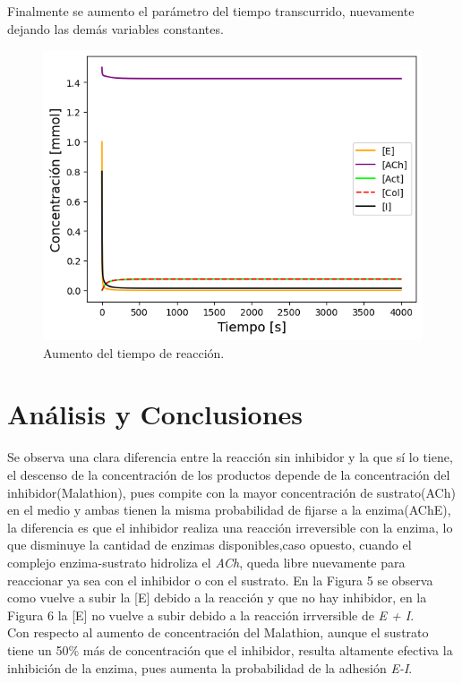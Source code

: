 Finalmente se aumento el parámetro del tiempo transcurrido, nuevamente dejando las demás variables constantes.

\begin{figure}[h]
	\centering
	\includegraphics[width=\columnwidth]{img/mast.png}
	\caption{Aumento del tiempo de reacción.}
	\label{7}
\end{figure}

\section{Análisis y Conclusiones}

Se observa una clara diferencia entre la reacción sin inhibidor y la que sí lo tiene, el descenso de la concentración de los productos depende de la concentración del inhibidor(Malathion), pues compite con la mayor concentración de sustrato(ACh) en el medio y ambas tienen la misma probabilidad de fijarse a la enzima(AChE), la diferencia es que el inhibidor realiza una reacción irreversible con la enzima, lo que disminuye la cantidad de enzimas disponibles,caso opuesto, cuando el complejo enzima-sustrato hidroliza el \textit{ACh}, queda libre nuevamente para reaccionar ya sea con el inhibidor o con el sustrato. En la Figura 5 se observa como vuelve a subir la [E] debido a la reacción y que no hay inhibidor, en la Figura 6 la [E] no vuelve a subir debido a la reacción irrversible de \textit{E + I}. \\

Con respecto al aumento de concentración del Malathion, aunque el sustrato tiene un 50\% más de concentración que el inhibidor, resulta altamente efectiva la inhibición de la enzima, pues aumenta la probabilidad de la adhesión \textit{E-I}.

